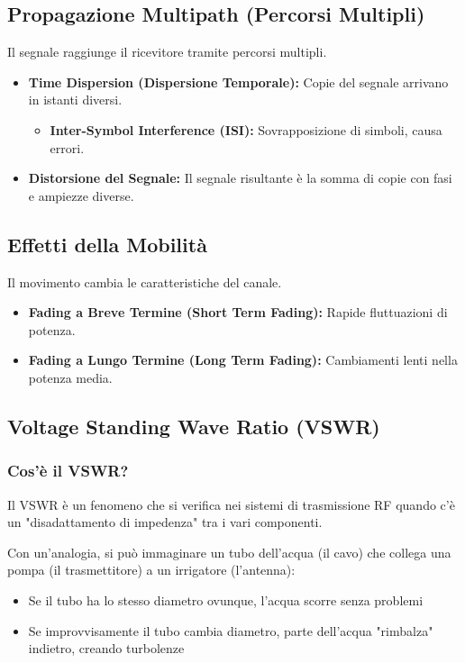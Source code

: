 \subsection{Propagazione Multipath (Percorsi Multipli)}
Il segnale raggiunge il ricevitore tramite percorsi multipli.
\begin{itemize}
    \item \textbf{Time Dispersion (Dispersione Temporale):} Copie del segnale arrivano in istanti diversi.
    \begin{itemize}
        \item \textbf{Inter-Symbol Interference (ISI):} Sovrapposizione di simboli, causa errori.
    \end{itemize}
    \item \textbf{Distorsione del Segnale:} Il segnale risultante è la somma di copie con fasi e ampiezze diverse.
\end{itemize}

\subsection{Effetti della Mobilità}
Il movimento cambia le caratteristiche del canale.
\begin{itemize}
    \item \textbf{Fading a Breve Termine (Short Term Fading):} Rapide fluttuazioni di potenza.
    \item \textbf{Fading a Lungo Termine (Long Term Fading):} Cambiamenti lenti nella potenza media.
\end{itemize}

\subsection{Voltage Standing Wave Ratio (VSWR)}
\subsubsection{Cos'è il VSWR?}
Il VSWR è un fenomeno che si verifica nei sistemi di trasmissione RF quando c'è un "disadattamento di impedenza" tra i vari componenti.

Con un'analogia, si può immaginare un tubo dell'acqua (il cavo) che collega una pompa (il trasmettitore) a un irrigatore (l'antenna):
\begin{itemize}
    \item Se il tubo ha lo stesso diametro ovunque, l'acqua scorre senza problemi
    \item Se improvvisamente il tubo cambia diametro, parte dell'acqua "rimbalza" indietro, creando turbolenze
\end{itemize}

